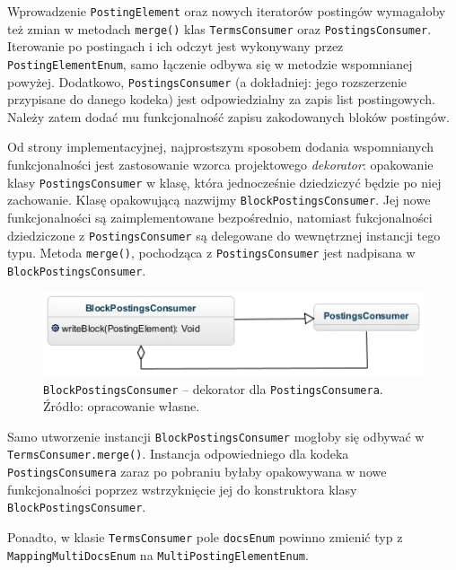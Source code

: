 Wprowadzenie \texttt{PostingElement} oraz nowych iteratorów postingów wymagałoby też zmian w metodach \texttt{merge()} klas \texttt{TermsConsumer} oraz \texttt{PostingsConsumer}. Iterowanie po postingach i ich odczyt jest wykonywany przez \texttt{PostingElementEnum}, samo łączenie odbywa się w metodzie wspomnianej powyżej. Dodatkowo, \texttt{PostingsConsumer} (a dokładniej: jego rozszerzenie przypisane do danego kodeka) jest odpowiedzialny za zapis list postingowych. Należy zatem dodać mu funkcjonalność zapisu zakodowanych bloków postingów. 

Od strony implementacyjnej, najprostszym sposobem dodania wspomnianych funkcjonalności jest zastosowanie wzorca projektowego \emph{dekorator}: opakowanie klasy \texttt{PostingsConsumer} w klasę, która jednocześnie dziedziczyć będzie po niej zachowanie. Klasę opakowującą nazwijmy \texttt{BlockPostingsConsumer}. Jej nowe funkcjonalności są zaimplementowane bezpośrednio, natomiast fukcjonalności dziedziczone z \texttt{PostingsConsumer} są delegowane do wewnętrznej instancji tego typu. Metoda \texttt{merge()}, pochodząca z \texttt{PostingsConsumer} jest nadpisana w \texttt{BlockPostingsConsumer}.

\begin{figure}[here]
 \centering
 \includegraphics[scale=0.7]{pictures/PostingsConsumerWrapper.jpg}
 \caption{\texttt{BlockPostingsConsumer} -- dekorator dla \texttt{PostingsConsumera}. Źródło: opracowanie własne. \label{fig:postingsConsumerWrapper}}
\end{figure}

Samo utworzenie instancji \texttt{BlockPostingsConsumer} mogłoby się odbywać w \texttt{TermsConsumer.merge()}. Instancja odpowiedniego dla kodeka \texttt{PostingsConsumera} zaraz po pobraniu byłaby opakowywana w nowe funkcjonalności poprzez wstrzyknięcie jej do konstruktora klasy \texttt{BlockPostingsConsumer}.

Ponadto, w klasie \texttt{TermsConsumer} pole \texttt{docsEnum} powinno zmienić typ z \texttt{MappingMultiDocsEnum} na \texttt{MultiPostingElementEnum}.

